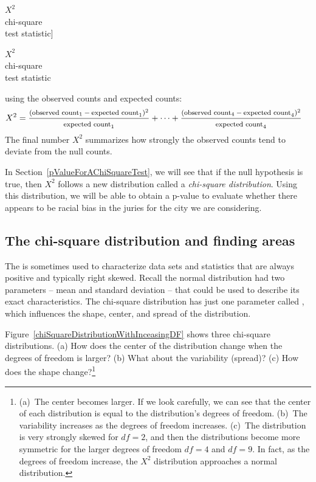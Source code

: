 $X^2$\vspace{0.5mm}\\\footnotesize chi-square\\test statistic]{\raggedright\vspace{9mm}

$X^2$\vspace{0.5mm}\\\footnotesize chi-square\\test statistic} using the observed counts and expected counts:
{\begin{align*}
X^2 &=
	\frac
	{\text{\footnotesize$(\text{observed count}_1 - \text{expected count}_1)^2$}}
	{\text{\footnotesize$\text{expected count}_1$}}
	+ \dots + \frac
	{\text{\footnotesize$(\text{observed count}_4 - \text{expected count}_4)^2$}}
	{\text{\footnotesize$\text{expected count}_4$}}
\end{align*}
}The final number $X^2$ summarizes how strongly the observed counts tend to deviate from the null counts.

In Section~\ref{pValueForAChiSquareTest}, we will see that if the null hypothesis is true, then $X^2$ follows a new distribution called a \emph{chi-square distribution}. Using this distribution, we will be able to obtain a p-value to evaluate whether there appears to be racial bias in the juries for the city we are considering.


\subsection{The chi-square distribution and finding areas}

The  is sometimes used to characterize data sets and statistics that are always positive and typically right skewed. Recall the normal distribution had two parameters -- mean and standard deviation -- that could be used to describe its exact characteristics. The chi-square distribution has just one parameter called , which influences the shape, center, and spread of the distribution.

\begin{exercise}\label{exerChiSquareDistributionDescriptionWithMoreDOF}
Figure~\ref{chiSquareDistributionWithInceasingDF} shows three chi-square distributions. (a) How does the center of the distribution change when the degrees of freedom is larger? (b) What about the variability (spread)? (c) How does the shape change?\footnote{(a)~The center becomes larger. If we look carefully, we can see that the center of each distribution is equal to the distribution's degrees of freedom. (b)~The variability increases as the degrees of freedom increases. (c)~The distribution is very strongly skewed for $df=2$, and then the distributions become more symmetric for the larger degrees of freedom $df=4$ and $df=9$. In fact, as the degrees of freedom increase, the $X^2$ distribution approaches a normal distribution. }
\end{exercise}

